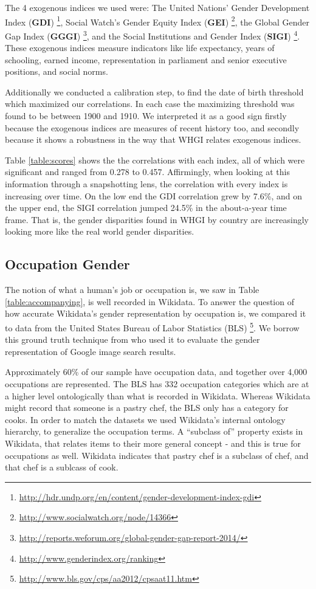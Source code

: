 \documentclass[letterpaper]{article}
\begin{document}
The 4 exogenous indices we used were: The United Nations' Gender Development Index (\textbf{GDI})  \footnote{\url{http://hdr.undp.org/en/content/gender-development-index-gdi}},  Social Watch's Gender Equity Index (\textbf{GEI}) \footnote{\url{http://www.socialwatch.org/node/14366}},  the Global Gender Gap Index (\textbf{GGGI}) \footnote{\url{http://reports.weforum.org/global-gender-gap-report-2014/}}, and the Social Institutions and Gender Index (\textbf{SIGI}) \footnote{\url{http://www.genderindex.org/ranking}}. 
These exogenous indices measure indicators like life expectancy, years of schooling, earned income, representation in parliament and senior executive positions, and social norms.

Additionally we conducted a calibration step, to find the date of birth threshold which maximized our correlations. In each case the maximizing threshold was found to be between 1900 and 1910. We interpreted it as a good sign firstly because the exogenous indices are measures of recent history too, and secondly because it shows a robustness in the way that WHGI relates exogenous indices.

Table \ref{table:scores} shows the the correlations with each index, all of which were significant and ranged from 0.278 to 0.457. Affirmingly, when looking at this information through a snapshotting lens, the correlation with every index is increasing over time. On the low end the GDI correlation grew by 7.6\%, and on the upper end, the SIGI correlation jumped 24.5\% in the about-a-year time frame. That is, the gender disparities found in WHGI by country are increasingly looking more like the real world gender disparities.


\subsection{Occupation Gender}
The notion of what a human's job or occupation is, we saw in Table \ref{table:accompanying}, is well recorded in Wikidata. To answer the question of how accurate Wikidata's gender representation by occupation is, we compared it to data from the United States Bureau of Labor Statistics (BLS) \footnote{\url{http://www.bls.gov/cps/aa2012/cpsaat11.htm}}. We borrow this ground truth technique from \cite{kay_unequal_2015} who used it to evaluate the gender representation of Google image search results.

Approximately 60\% of our sample have occupation data, and together over 4,000 occupations are represented. The BLS has 332 occupation categories which are at a higher level ontologically than what is recorded in Wikidata. Whereas Wikidata might record that someone is a pastry chef, the BLS only has a category for cooks. In order to match the datasets we used Wikidata's internal ontology hierarchy, to generalize the occupation terms. A ``subclass of'' property exists in Wikidata, that relates items to their more general concept - and this is true for occupations as well. Wikidata indicates that pastry chef is a subclass of chef, and that chef is a sublcass of cook. 
\end{document}

